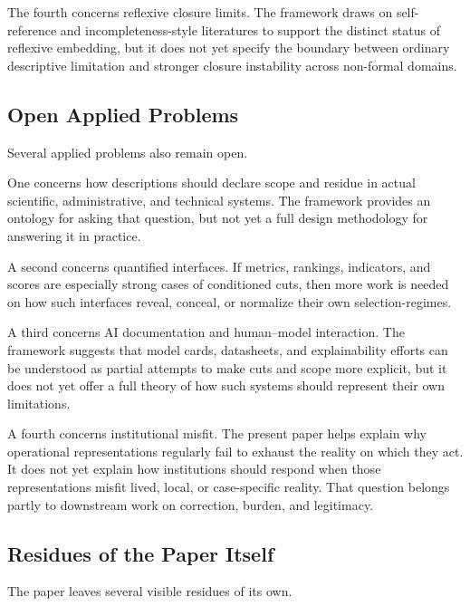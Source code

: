 \documentclass[11pt]{article}
\begin{document}
The fourth concerns reflexive closure limits. The framework draws on self-reference and incompleteness-style literatures to support the distinct status of reflexive embedding, but it does not yet specify the boundary between ordinary descriptive limitation and stronger closure instability across non-formal domains. \cite{bolander_self_reference_sep}

\subsection{Open Applied Problems}

Several applied problems also remain open.

One concerns how descriptions should declare scope and residue in actual scientific, administrative, and technical systems. The framework provides an ontology for asking that question, but not yet a full design methodology for answering it in practice.

A second concerns quantified interfaces. If metrics, rankings, indicators, and scores are especially strong cases of conditioned cuts, then more work is needed on how such interfaces reveal, conceal, or normalize their own selection-regimes. \cite{espeland_stevens_quantification,merry_seductions_of_quantification,porter_trust_in_numbers}

A third concerns AI documentation and human--model interaction. The framework suggests that model cards, datasheets, and explainability efforts can be understood as partial attempts to make cuts and scope more explicit, but it does not yet offer a full theory of how such systems should represent their own limitations. \cite{mitchell_model_cards,gebru_datasheets,nist_ai_rmf,nist_explainable_ai}

A fourth concerns institutional misfit. The present paper helps explain why operational representations regularly fail to exhaust the reality on which they act. It does not yet explain how institutions should respond when those representations misfit lived, local, or case-specific reality. That question belongs partly to downstream work on correction, burden, and legitimacy. \cite{scott_seeing_like_a_state,bowker_star_sorting_things_out,herd_moynihan_administrative_burden}

\subsection{Residues of the Paper Itself}

The paper leaves several visible residues of its own.
\end{document}
